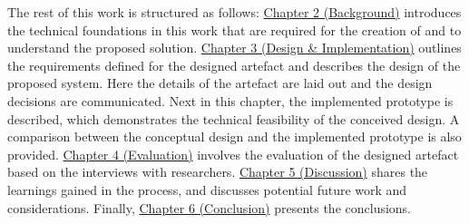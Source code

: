 The rest of this work is structured as follows: \hyperref[chapter:background]{Chapter 2 (Background)} introduces the technical foundations in this work that are required for the creation of and to understand the proposed solution. \hyperref[chapter:design]{Chapter 3 (Design \& Implementation)} outlines the requirements defined for the designed artefact and describes the design of the proposed system. Here the details of the artefact are laid out and the design decisions are communicated. Next in this chapter, the implemented prototype is described, which demonstrates the technical feasibility of the conceived design. A comparison between the conceptual design and the implemented prototype is also provided. \hyperref[chapter:evaluation]{Chapter 4 (Evaluation)} involves the evaluation of the designed artefact based on the interviews with researchers. \hyperref[chapter:discussion]{Chapter 5 (Discussion)} shares the learnings gained in the process, and discusses potential future work and considerations. Finally, \hyperref[chapter:conclusion]{Chapter 6 (Conclusion)} presents the conclusions.